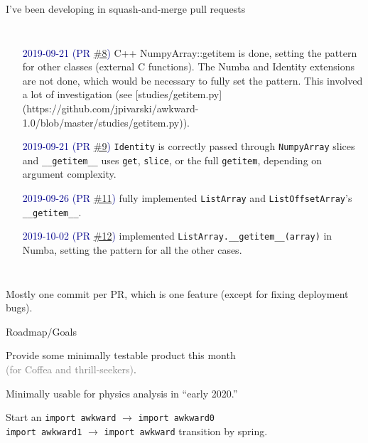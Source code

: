 \documentclass[aspectratio=169]{beamer}
\begin{document}
\begin{frame}{I've been developing in squash-and-merge pull requests}
\begin{columns}
\begin{itemize}
\item[\textcolor{darkblue}{2019-09-21 (PR \href{https://github.com/scikit-hep/awkward-1.0/pull/8}{\#8})}] C++ NumpyArray::getitem is done, setting the pattern for other classes (external C functions). The Numba and Identity extensions are not done, which would be necessary to fully set the pattern. This involved a lot of investigation (see [studies/getitem.py](https://github.com/jpivarski/awkward-1.0/blob/master/studies/getitem.py)).
\item[\textcolor{darkblue}{2019-09-21 (PR \href{https://github.com/scikit-hep/awkward-1.0/pull/9}{\#9})}] \texttt{Identity} is correctly passed through \texttt{NumpyArray} slices and \texttt{__getitem__} uses \texttt{get}, \texttt{slice}, or the full \texttt{getitem}, depending on argument complexity.
\item[\textcolor{darkblue}{2019-09-26 (PR \href{https://github.com/scikit-hep/awkward-1.0/pull/11}{\#11})}] fully implemented \texttt{ListArray} and \texttt{ListOffsetArray}'s \texttt{__getitem__}.
\item[\textcolor{darkblue}{2019-10-02 (PR \href{https://github.com/scikit-hep/awkward-1.0/pull/12}{\#12})}] implemented \texttt{ListArray.__getitem__(array)} in Numba, setting the pattern for all the other cases.
\end{itemize}
\end{columns}

\normalsize
\vspace{0.35 cm}
Mostly one commit per PR, which is one feature (except for fixing deployment bugs).
\end{frame}

\begin{frame}{Roadmap/Goals}
\Large
\begin{center}
Provide some minimally testable product this month \\ \textcolor{gray}{(for Coffea and thrill-seekers)}.

\vspace{1 cm}
Minimally usable for physics analysis in ``early 2020.''

\vspace{1 cm}
\end{center}

Start an {\normalsize \texttt{import awkward}} $\to$ {\normalsize \texttt{import awkward0}} \\
\phantom{Start an} {\normalsize \texttt{import awkward1}} $\to$ {\normalsize \texttt{import awkward}} transition by spring.
\end{frame}
\end{document}
